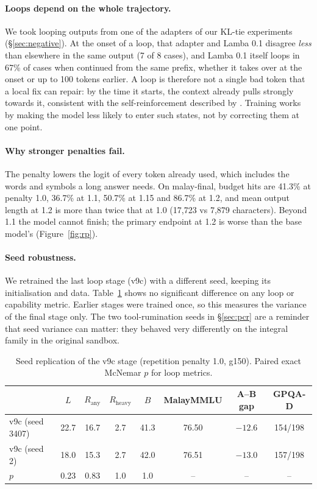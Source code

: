 \documentclass[11pt]{article}
\newcommand{\Rany}{R_{\text{any}}}
\newcommand{\Rheavy}{R_{\text{heavy}}}
\begin{document}
\paragraph{Loops depend on the whole trajectory.} We took looping outputs from one of the adapters of our KL-tie experiments (\S\ref{sec:negative}). At the onset of a loop, that adapter and Lamba 0.1 disagree \emph{less} than elsewhere in the same output (7 of 8 cases), and Lamba 0.1 itself loops in 67\% of cases when continued from the same prefix, whether it takes over at the onset or up to 100 tokens earlier. A loop is therefore not a single bad token that a local fix can repair: by the time it starts, the context already pulls strongly towards it, consistent with the self-reinforcement described by \citet{xu2022ditto}. Training works by making the model less likely to enter such states, not by correcting them at one point.

\paragraph{Why stronger penalties fail.} The penalty lowers the logit of every token already used, which includes the words and symbols a long answer needs. On malay-final, budget hits are 41.3\% at penalty 1.0, 36.7\% at 1.1, 50.7\% at 1.15 and 86.7\% at 1.2, and mean output length at 1.2 is more than twice that at 1.0 (17,723 vs 7,879 characters). Beyond 1.1 the model cannot finish; the primary endpoint at 1.2 is worse than the base model's (Figure~\ref{fig:rp}).

\paragraph{Seed robustness.} We retrained the last loop stage (v9c) with a different seed, keeping its initialisation and data. Table~\ref{tab:seed} shows no significant difference on any loop or capability metric. Earlier stages were trained once, so this measures the variance of the final stage only. The two tool-rumination seeds in \S\ref{sec:pcr} are a reminder that seed variance can matter: they behaved very differently on the integral family in the original sandbox.

\begin{table}[t]
\centering
\small
\caption{Seed replication of the v9c stage (repetition penalty 1.0, g150). Paired exact McNemar $p$ for loop metrics.}
\label{tab:seed}
\begin{tabular}{lccccccc}
\toprule
 & $L$ & $\Rany$ & $\Rheavy$ & $B$ & MalayMMLU & A--B gap & GPQA-D \\
\midrule
v9c (seed 3407) & 22.7 & 16.7 & 2.7 & 41.3 & 76.50 & $-12.6$ & 154/198 \\
v9c (seed 2) & 18.0 & 15.3 & 2.7 & 42.0 & 76.51 & $-13.0$ & 157/198 \\
$p$ & 0.23 & 0.83 & 1.0 & 1.0 & -- & -- & -- \\
\bottomrule
\end{tabular}
\end{table}
\end{document}
